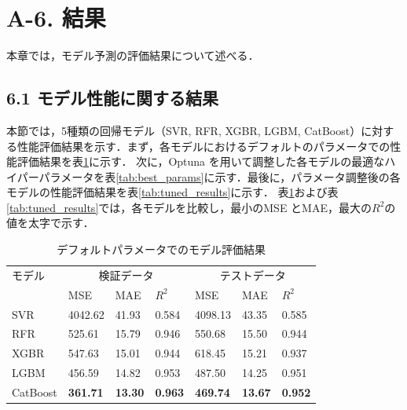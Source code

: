 \section*{A-6. 結果}
本章では，モデル予測の評価結果について述べる．

\subsection*{6.1 モデル性能に関する結果}
本節では，5種類の回帰モデル（SVR, RFR, XGBR, LGBM, CatBoost）に対する性能評価結果を示す．まず，各モデルにおけるデフォルトのパラメータでの性能評価結果を表\ref{tab:default_results}に示す．
次に，Optuna を用いて調整した各モデルの最適なハイパーパラメータを表\ref{tab:best_params}に示す．最後に，パラメータ調整後の各モデルの性能評価結果を表\ref{tab:tuned_results}に示す．
表\ref{tab:default_results}および表\ref{tab:tuned_results}では，各モデルを比較し，最小のMSE とMAE，最大の$R^2$の値を太字で示す．

\begin{table}[tb]
    \centering
    \doublerulesep=0.3pt
    \caption{デフォルトパラメータでのモデル評価結果}
    \label{tab:default_results}
    \begin{tabular}{l|p{0.8cm}p{0.8cm}p{0.8cm}|p{0.8cm}p{0.8cm}p{0.8cm}}
        \hline\hline\hline
        モデル & \multicolumn{3}{c|}{検証データ} & \multicolumn{3}{c}{テストデータ} \\
               & MSE & MAE & $R^2$ & MSE & MAE & $R^2$ \\
        \hline
        SVR       & 4042.62 & 41.93 & 0.584 & 4098.13 & 43.35 & 0.585 \\
        RFR       & 525.61  & 15.79 & 0.946 & 550.68  & 15.50 & 0.944 \\
        XGBR      & 547.63  & 15.01 & 0.944 & 618.45  & 15.21 & 0.937 \\
        LGBM      & 456.59  & 14.82 & 0.953 & 487.50  & 14.25 & 0.951 \\
        CatBoost  & \textbf{361.71}  & \textbf{13.30} & \textbf{0.963} & \textbf{469.74}  & \textbf{13.67} & \textbf{0.952} \\
        \hline\hline\hline
    \end{tabular}
\end{table}

